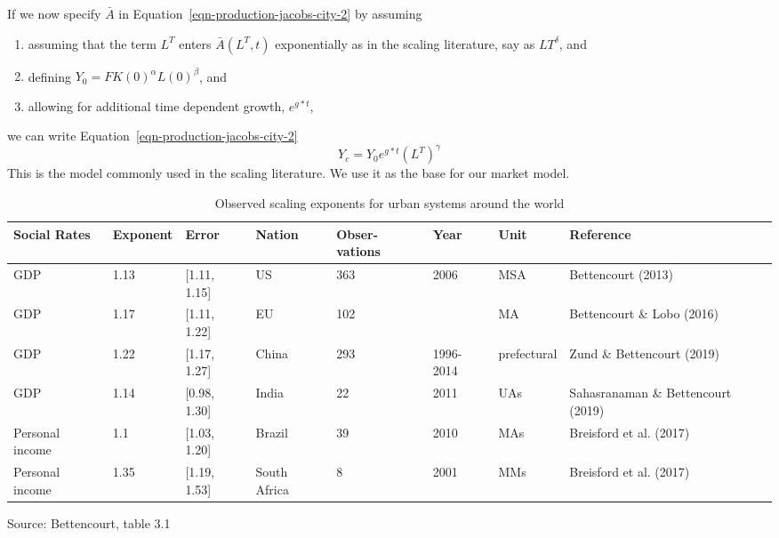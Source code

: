 If we now specify $\bar A$ in Equation~\ref{eqn-production-jacobs-city-2} by assuming \begin{enumerate}
    \item  assuming that the term $L^T$ enters $\bar A(L^T, t)$ exponentially as in the scaling literature, say as $LT^\delta$,    and 
    \item defining $Y_0=F K(0)^\alpha L(0)^\beta$, and 
    \item allowing  for additional time dependent growth, $e^{g*t}$,
\end{enumerate}
we can write Equation~\ref{eqn-production-jacobs-city-2} 
\begin{equation}Y_c = Y_0e^{g*t}(L^T)^\gamma\label{eqn-production-jacobs-scale}
\end{equation}
This is the model commonly used in the scaling literature. We use it as the base for our market model. 



\begin{table}[htb]\small
\centering
\begin{tabular}{|p{1.5cm}|l|l|p{1.5cm}|p{1.4cm}|p{}|l|p{2.5cm}|}\hline
\textbf{Social Rates} & \textbf{Exponent} & \textbf{Error} & \textbf{Nation} & \textbf{Obser-vations} & \textbf{Year} & \textbf{Unit} & \textbf{Reference} \\ \hline   
GDP             & 1.13 & [1.11, 1.15]  & US           & 363 & 2006        & MSA  & Bettencourt (2013)                 \\ \hline
GDP             & 1.17 & [1.11, 1.22]  & EU           & 102 &             & MA   & Bettencourt  \& Lobo        (2016) \\ \hline
GDP             & 1.22 & [1.17, 1.27]  & China        & 293 & 1996-2014   & prefectural & Zund  \& Bettencourt (2019) \\ \hline
GDP             & 1.14 & [0.98, 1.30]  & India        & 22  & 2011        & UAs  & Sahasranaman \& Bettencourt (2019) \\ \hline
Personal income & 1.1  & [1.03, 1.20]  & Brazil       & 39  & 2010        & MAs  & Breisford et al.  (2017)           \\ \hline
Personal income & 1.35 & [1.19, 1.53]  & South Africa & 8   & 2001        & MMs  & Breisford et al.  (2017)           \\ \hline
\end{tabular}
\caption[Observed scaling exponents]{Observed scaling exponents for urban systems around the world}
\label{table-scaling-exponents}
\small Source: Bettencourt, table 3.1
\end{table}


